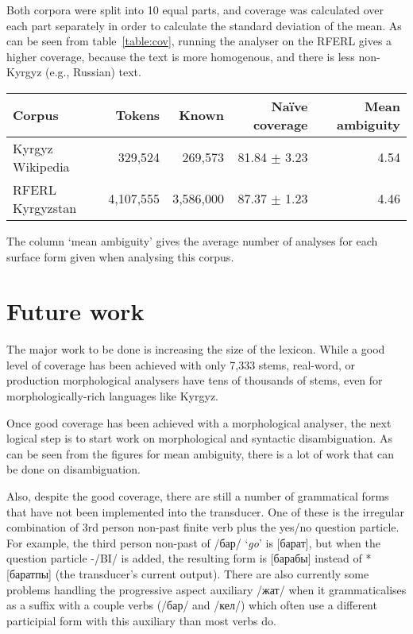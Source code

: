 \documentclass[10pt,a4paper,twocolumn]{article}
\newcommand{\eng}[1]{`{\em #1}'}
\begin{document}
Both corpora were split into 10 equal parts, and coverage was calculated over each part separately in order to calculate the standard deviation of the mean. As can be seen from table~\ref{table:cov}, running the analyser on the RFERL gives a higher coverage, because the text is more homogenous, and there is less non-Kyrgyz (e.g., Russian) text.

\begin{table*}[htbp]
	\centering
	\begin{tabular}{lrrrr}
		\toprule
		Corpus           & Tokens    & Known     & Naïve coverage    & Mean ambiguity\\
		\midrule
		Kyrgyz Wikipedia & 329,524   & 269,573   & 81.84 $\pm$ 3.23  & 4.54\\
		RFERL Kyrgyzstan & 4,107,555 & 3,586,000 & 87.37 $\pm$ 1.23  & 4.46\\
		\bottomrule
	\end{tabular}
	\caption{FIXME}
	\label{table:cov}
\end{table*}

The column `mean ambiguity' gives the average number of analyses for each surface form given when analysing this corpus.

\section{Future work}

The major work to be done is increasing the size of the lexicon. While a good level of coverage has been achieved with only 7,333 stems, real-word, or production morphological analysers have tens of thousands of stems, even for morphologically-rich languages like Kyrgyz.

Once good coverage has been achieved with a morphological analyser, the next logical step is to start work on morphological and syntactic disambiguation. As can be seen from the figures for mean ambiguity, there is a lot of work that can be done on disambiguation.

Also, despite the good coverage, there are still a number of grammatical forms that have not been implemented into the transducer.  One of these is the irregular combination of 3rd person non-past finite verb plus the yes/no question particle.  For example, the third person non-past of /бар/ \eng{go} is [барат], but when the question particle -/BI/ is added, the resulting form is [барабы] instead of *[баратпы] (the transducer's current output).  There are also currently some problems handling the progressive aspect auxiliary /жат/ when it grammaticalises as a suffix with a couple verbs (/бар/ and /кел/) which often use a different participial form with this auxiliary than most verbs do.




\end{document}
